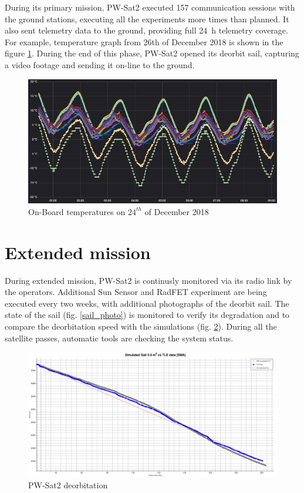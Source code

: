 During its primary mission, PW-Sat2 executed \si{157} communication sessions with the ground stations, executing all the experiments more times than planned. It also sent telemetry data to the ground, providing full \SI{24}{\hour} telemetry coverage. For example, temperature graph from 26th of December 2018 is shown in the figure \ref{onboard_temps}. During the end of this phase, PW-Sat2 opened its deorbit sail, capturing a video footage and sending it on-line to the ground.

\begin{figure}[H]
    \centering
    \includegraphics[width=0.65\paperwidth]{img/9/temps_24_12.jpg}
    \caption{On-Board temperatures on $24^{th}$ of December 2018}
    \label{onboard_temps}
\end{figure}

\section{Extended mission}
During extended mission, PW-Sat2 is continusly monitored via its radio link by the operators. Additional Sun Sensor and RadFET experiment are being executed every two weeks, with additional photographs of the deorbit sail. The state of the sail (fig. \ref{sail_photo}) is monitored to verify its degradation and to compare the deorbitation speed with the simulations (fig. \ref{deorbitation}). During all the satellite passes, automatic tools are checking the system status.

\begin{figure}[H]
    \centering
    \includegraphics[width=0.65\paperwidth]{img/9/deorbitation.png}
    \caption{PW-Sat2 deorbitation}
    \label{deorbitation}
\end{figure}

